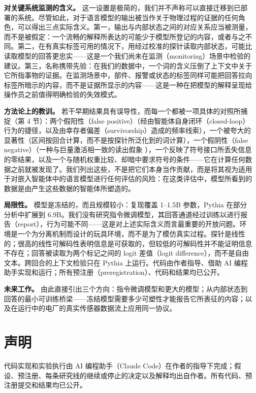 \documentclass[UTF8,fontset=none,a4paper]{ctexart}
\begin{document}
\textbf{对关键系统监测的含义。} 这一设置是极简的，我们并不声称可以直接迁移到已部署的系统。尽管如此，对于语言模型的输出被当作关于物理过程的证据的任何角色，可以得出三点实际含义。第一，输出与内部状态之间的对应关系应当被测量，而不是被假定：一个流畅的解释所表达的可能少于模型所登记的内容，或者与之不同。第二，在有真实标签可用的情况下，用经过校准的探针读取内部状态，可能比读取模型的回答更忠实------这是一个我们尚未在监测（monitoring）场景中检验的建议。第三，名称携带先验：在我们的数据中，一个词的含义压倒了上下文中关于它所指事物的证据。在监测场景中，部件、报警或状态的标签同样可能把回答拉向标签所暗示的内容，而不是证据所显示的内容------这是一种在把模型的解释呈现给操作员之前值得明确检验的失效模式。

\textbf{方法论上的教训。} 若干早期结果具有误导性，而每一个都被一项具体的对照所捕捉（第 4 节）：两个假阳性（false positive）（经由智能体自身闭环（\mbox{closed-loop}）行为的捷径，以及由幸存者偏差（survivorship）造成的频率线索），一个被夸大的显著性（区间按回合计算，而不是按探针所泛化到的词计算），一个假阴性（false negative）（一种与巨量激活相一致的读出假象 \citep{sun2024}），一个反映了符号接口所丢失信息的零结果，以及一个与随机权重比较、却暗中要求符号的条件------它在计算任何数据之前就被发现了。我们列出这些，不是把它们本身当作贡献，而是将其视为适用于对嵌入智能体中的语言模型进行任何评估的风险：在这类评估中，模型所看到的数据是由产生这些数据的智能体所塑造的。

\textbf{局限性。} 模型是冻结的，而且规模较小：复现覆盖 \mbox{1--1.5B} 参数，Pythia 在部分分析中扩展到 6.9B。我们没有研究指令微调模型，其回答通道经过训练以进行报告（report），行为可能不同------这是对上述实际含义而言最重要的开放问题。环境是一个为分离机制而设计的玩具环境，而不是为了模仿真实过程。探针是线性的；很高的线性可解码性表明信息是可获取的，但较低的可解码性并不能证明信息不存在；回答被读取为两个标记之间的 logit 差值（logit difference），而不是自由文本。跨回合的上下文检验只在 Pythia 上运行。代码由作者指导、借助 AI 编程助手实现和运行；所有预注册（preregistration）、代码和结果均已公开。

\textbf{未来工作。} 由此直接引出三个方向：指令微调模型和更大的模型；从内部状态到回答的最小可训练桥梁------冻结模型需要多少可塑性才能报告它所表征的内容；以及在运行中的电厂的真实传感器数据流上应用同一协议。


\section*{声明}
代码实现和实验执行由 AI 编程助手（Claude Code）在作者的指导下完成；假设、预注册、每条研究线的继续或停止的决定以及解释均出自作者。所有代码、预注册提交和结果均已公开。
\end{document}
